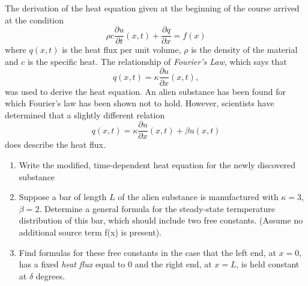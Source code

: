 
The derivation of the heat equation given at the beginning of the course arrived at the condition 
\[
\rho c \frac{\partial u}{\partial t} (x,t) + \frac{\partial q}{\partial x} = f(x)
\]
where $q(x,t)$ is the heat flux per unit volume, $\rho$ is the density of the material and $c$ is the specific heat.  The relationship of \textit{Fourier's Law}, which says that 
\[
q(x,t) = \kappa \frac{\partial u}{\partial x}(x,t),
\]
was used to derive the heat equation.  An alien substance has been found for which Fourier's law has been shown not to hold.  However, scientists have determined that a slightly different relation 
\[
q(x,t) = \kappa\frac{\partial u}{\partial x}(x,t) + \beta u(x,t)
\]
does describe the heat flux.

\begin{enumerate}
\item Write the modified, time-dependent heat equation for the newly discovered substance

\item Suppose a bar of length $L$ of the alien substance is manufactured with $\kappa = 3$, $\beta = 2$.  Determine a general formula for the steady-state termperature distribution of this bar, which should include two free constants.  (Assume no additional source term f(x) is present).

\item Find formulas for these free constants in the case that the left end, at $x=0$, has a fixed \textit{heat flux} equal to $0$ and the right end, at $x=L$, is held constant at $\delta$ degrees.

%
%

\end{enumerate}